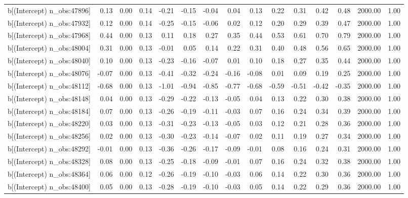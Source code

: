\begin{table}[ht]
\begin{tabular}{rrrrrrrrrrrrrrr}
  b[(Intercept) n\_obs:47896] & 0.13 & 0.00 & 0.14 & -0.21 & -0.15 & -0.04 & 0.04 & 0.13 & 0.22 & 0.31 & 0.42 & 0.48 & 2000.00 & 1.00 \\ 
  b[(Intercept) n\_obs:47932] & 0.12 & 0.00 & 0.14 & -0.25 & -0.15 & -0.06 & 0.02 & 0.12 & 0.20 & 0.29 & 0.39 & 0.47 & 2000.00 & 1.00 \\ 
  b[(Intercept) n\_obs:47968] & 0.44 & 0.00 & 0.13 & 0.11 & 0.18 & 0.27 & 0.35 & 0.44 & 0.53 & 0.61 & 0.70 & 0.79 & 2000.00 & 1.00 \\ 
  b[(Intercept) n\_obs:48004] & 0.31 & 0.00 & 0.13 & -0.01 & 0.05 & 0.14 & 0.22 & 0.31 & 0.40 & 0.48 & 0.56 & 0.65 & 2000.00 & 1.00 \\ 
  b[(Intercept) n\_obs:48040] & 0.10 & 0.00 & 0.13 & -0.23 & -0.16 & -0.07 & 0.01 & 0.10 & 0.18 & 0.27 & 0.35 & 0.44 & 2000.00 & 1.00 \\ 
  b[(Intercept) n\_obs:48076] & -0.07 & 0.00 & 0.13 & -0.41 & -0.32 & -0.24 & -0.16 & -0.08 & 0.01 & 0.09 & 0.19 & 0.25 & 2000.00 & 1.00 \\ 
  b[(Intercept) n\_obs:48112] & -0.68 & 0.00 & 0.13 & -1.01 & -0.94 & -0.85 & -0.77 & -0.68 & -0.59 & -0.51 & -0.42 & -0.35 & 2000.00 & 1.00 \\ 
  b[(Intercept) n\_obs:48148] & 0.04 & 0.00 & 0.13 & -0.29 & -0.22 & -0.13 & -0.05 & 0.04 & 0.13 & 0.22 & 0.30 & 0.38 & 2000.00 & 1.00 \\ 
  b[(Intercept) n\_obs:48184] & 0.07 & 0.00 & 0.13 & -0.26 & -0.19 & -0.11 & -0.03 & 0.07 & 0.16 & 0.24 & 0.34 & 0.39 & 2000.00 & 1.00 \\ 
  b[(Intercept) n\_obs:48220] & 0.03 & 0.00 & 0.13 & -0.31 & -0.23 & -0.13 & -0.05 & 0.03 & 0.12 & 0.21 & 0.28 & 0.36 & 2000.00 & 1.00 \\ 
  b[(Intercept) n\_obs:48256] & 0.02 & 0.00 & 0.13 & -0.30 & -0.23 & -0.14 & -0.07 & 0.02 & 0.11 & 0.19 & 0.27 & 0.34 & 2000.00 & 1.00 \\ 
  b[(Intercept) n\_obs:48292] & -0.01 & 0.00 & 0.13 & -0.36 & -0.26 & -0.17 & -0.09 & -0.01 & 0.08 & 0.16 & 0.24 & 0.31 & 2000.00 & 1.00 \\ 
  b[(Intercept) n\_obs:48328] & 0.08 & 0.00 & 0.13 & -0.25 & -0.18 & -0.09 & -0.01 & 0.07 & 0.16 & 0.24 & 0.32 & 0.38 & 2000.00 & 1.00 \\ 
  b[(Intercept) n\_obs:48364] & 0.06 & 0.00 & 0.12 & -0.26 & -0.19 & -0.10 & -0.03 & 0.06 & 0.14 & 0.22 & 0.30 & 0.36 & 2000.00 & 1.00 \\ 
  b[(Intercept) n\_obs:48400] & 0.05 & 0.00 & 0.13 & -0.28 & -0.19 & -0.10 & -0.03 & 0.05 & 0.14 & 0.22 & 0.29 & 0.36 & 2000.00 & 1.00 \\ 

\end{tabular}
\end{table}
